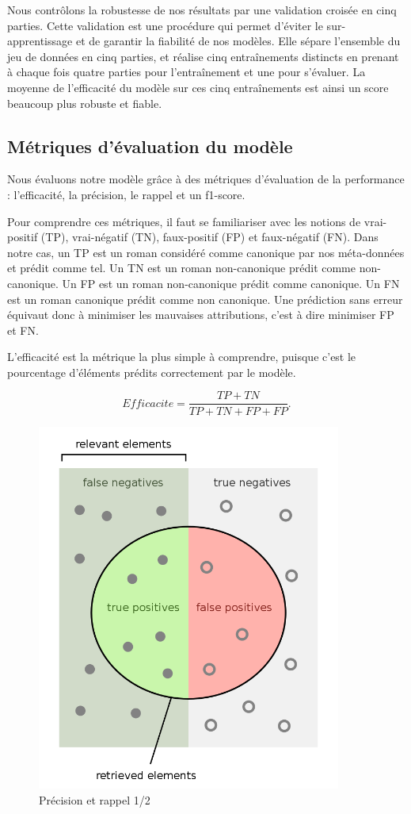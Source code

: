 Nous contrôlons la robustesse de nos résultats par une validation croisée en cinq parties. Cette validation est une procédure qui permet d'éviter le sur-apprentissage et de garantir la fiabilité de nos modèles. Elle sépare l'ensemble du jeu de données en cinq parties, et réalise cinq entraînements distincts en prenant à chaque fois quatre parties pour l'entraînement et une pour s'évaluer. La moyenne de l'efficacité du modèle sur ces cinq entraînements est ainsi un score beaucoup plus robuste et fiable. 

\subsection{Métriques d'évaluation du modèle}

Nous évaluons notre modèle grâce à des métriques d'évaluation de la performance : l'efficacité, la précision, le rappel et un f1-score.

Pour comprendre ces métriques, il faut se familiariser avec les notions de vrai-positif (TP), vrai-négatif (TN), faux-positif (FP) et faux-négatif (FN). Dans notre cas, un TP est un roman considéré comme canonique par nos méta-données et prédit comme tel. Un TN est un roman non-canonique prédit comme non-canonique. Un FP est un roman non-canonique prédit comme canonique. Un FN est un roman canonique prédit comme non canonique. Une prédiction sans erreur équivaut donc à minimiser les mauvaises attributions, c'est à dire minimiser FP et FN. 

L'efficacité est la métrique la plus simple à comprendre, puisque c'est le pourcentage d'éléments prédits correctement par le modèle. 

\begin{equation}
Efficacite = \frac{TP + TN}{TP + TN + FP + FP}.
\end{equation}


\bigskip
\begin{figure}[!ht]
    \centering
    \includegraphics[width=10cm]{img/06_precision_recall.png}
    \caption[Précision et rappel 1/2]{Précision et rappel 1/2\footnotemark}
    \label{modelevaluation}
\end{figure}


